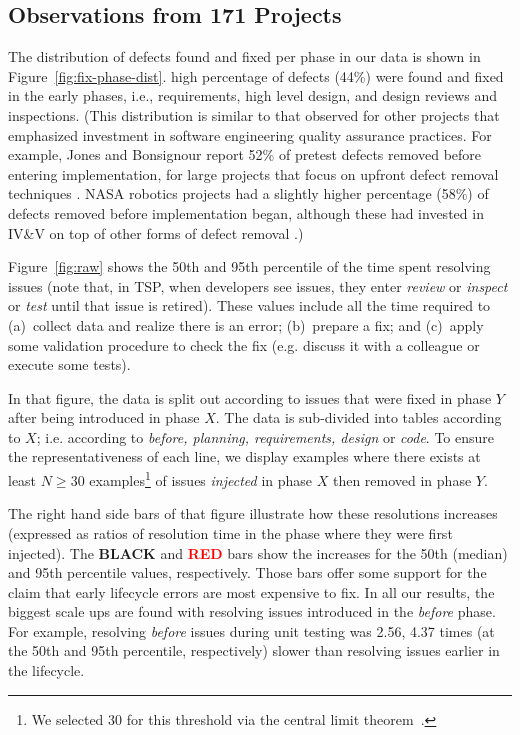 \documentclass[smallcondesed]{svjour3}
\newcommand{\fig}[1]{Figure~\ref{fig:#1}}
\begin{document}
 
 
 
 
 
\subsection{Observations from 171 Projects}

The distribution of defects found and fixed per phase in our data is shown in Figure~\ref{fig:fix-phase-dist}. 
 high percentage of defects (44\%) were found and fixed in the early phases, i.e., requirements, high level design, and design reviews and inspections. (This distribution is similar to that observed for other projects that emphasized investment in software engineering quality assurance practices. For example, Jones and Bonsignour report 52\% of pretest defects removed before entering implementation, for large projects that focus on upfront defect removal techniques \cite{jones12}. NASA robotics projects had a slightly higher percentage (58\%) of defects removed before implementation began, although these had invested in IV\&V on top of other forms of defect removal \cite{me08a}.)  

\fig{raw} shows the  50th and 95th percentile
of the time spent resolving issues
(note that, in TSP, when developers see issues, they enter {\em review} or 
{\em inspect} or {\em test}
until that issue is retired).
These values include all the time required  to (a)~collect data and realize there is an error;
(b)~prepare a fix;  and (c)~apply some validation
procedure to check the fix (e.g. discuss it with a colleague or execute some tests).


In that figure, the data is split out according to issues that were fixed in phase $Y$ after
being introduced in phase $X$. The data is sub-divided into tables according to $X$;
i.e. according to {\em before, planning, requirements, design} or {\em  code}. 
To ensure the representativeness of each line, we display examples
where there exists at least $N\ge 30$ examples\footnote{We selected 30
for this threshold via the central limit theorem~\cite{maxwelldata}.} of issues {\em injected} in phase $X$ then
removed in phase $Y$.

The right hand side bars of that figure
illustrate how these resolutions increases (expressed as ratios of resolution time in the phase where they were first injected).
The {\bf BLACK} and \textcolor{red}{{\bf RED}} bars show the increases for the  50th (median) and 95th percentile values, respectively.
Those bars offer some support for the 
claim that early lifecycle errors are most expensive to fix.
In all our results, the biggest scale ups are found with resolving
issues introduced in the {\em before} phase. For example,
resolving {\em before} issues during unit testing was 2.56, 4.37 times (at the 50th and 95th percentile, respectively)
slower than resolving issues earlier in the lifecycle. 
\end{document}
